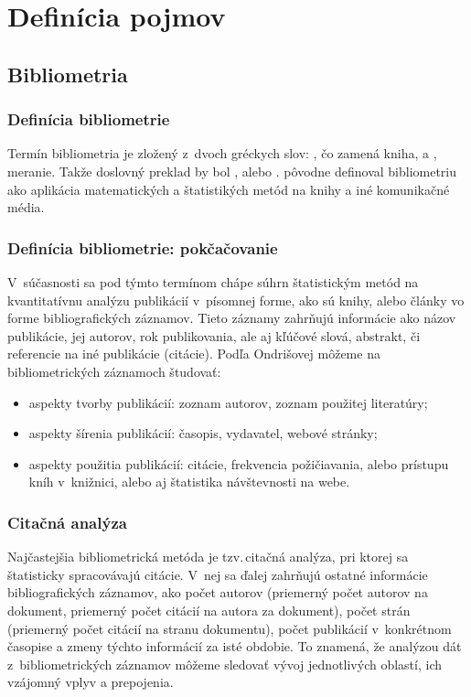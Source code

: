 \section{Definícia pojmov}

\subsection{Bibliometria}

\begin{frame}
  \frametitle{Definícia bibliometrie}

Termín bibliometria je zložený z~dvoch gréckych slov:
, čo zamená kniha, a
, meranie.  Takže doslovný
preklad by bol , alebo .
\citet{Pritchard1969} pôvodne definoval bibliometriu ako aplikácia
matematických a štatistikých metód na knihy a iné komunikačné média.

\end{frame}

\begin{frame}
  \frametitle{Definícia bibliometrie: pokčačovanie}

V~súčasnosti sa pod týmto termínom chápe súhrn štatistickým metód na
kvantitatívnu analýzu publikácií v~písomnej forme, ako sú knihy, alebo články
vo forme bibliografických záznamov.  Tieto záznamy zahrňujú informácie ako
názov publikácie, jej autorov, rok publikovania, ale aj kľúčové slová,
abstrakt, či referencie na iné publikácie (citácie).  Podľa Ondrišovej
\citeyearpar{Ondrisova2011} môžeme na bibliometrických záznamoch študovať:

\begin{itemize}
\item aspekty tvorby publikácií:  zoznam autorov, zoznam použitej literatúry;
\item aspekty šírenia publikácií:  časopis, vydavatel, webové stránky;
\item aspekty použitia publikácií:  citácie, frekvencia  požičiavania, alebo
    prístupu kníh v~knižnici, alebo aj štatistika návštevnosti na webe.

\end{itemize}

\end{frame}

\begin{frame}
  \frametitle{Citačná analýza}

Najčastejšia bibliometrická metóda je tzv.\,citačná analýza,  pri ktorej sa štatisticky spracovávajú citácie.  V~nej sa ďalej
zahrňujú ostatné informácie bibliografických záznamov, ako počet autorov
(priemerný počet autorov na dokument, priemerný počet citácií na autora za
dokument), počet strán (priemerný počet citácií na stranu dokumentu), počet
publikácií v~konkrétnom časopise a zmeny týchto informácií za isté obdobie.  To
znamená, že analýzou dát z~bibliometrických záznamov môžeme sledovať vývoj
jednotlivých oblastí, ich vzájomný vplyv a prepojenia.

\end{frame}

